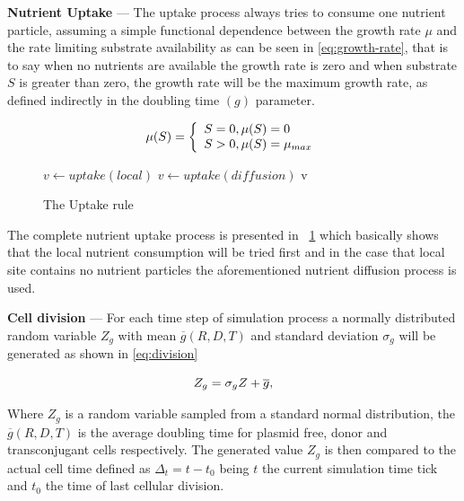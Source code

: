 {\bf Nutrient Uptake} --- The uptake process always tries to consume one nutrient particle, assuming a simple functional dependence between the growth rate $\mu$ and the rate limiting substrate availability as can be seen in \eqref{eq:growth-rate}, that is to say when no nutrients are available the growth rate is zero and when substrate $S$ is greater than zero, the growth rate will be the maximum growth rate, as defined indirectly in the doubling time $(g)$ parameter. 

\begin{equation}
\label{eq:growth-rate}
  \mu(S) = \left\{ 
  \begin{array}{l l}
    S = 0, \mu(S) = 0		\\
    S > 0, \mu(S) = \mu_{max}	\\
  \end{array} \right.
\end{equation} 

\begin{figure}
\begin{algorithmic}[1]
\State $v \gets uptake(local)$
\State $v \gets uptake(diffusion)$ 
\EndIf
\State \Return v
\EndFunction
\end{algorithmic}
\caption[Uptake]{\label{alg:uptake} The Uptake rule}
\end{figure}

The complete nutrient uptake process is presented in ~\ref{alg:uptake} which basically shows that the local nutrient consumption will be tried first and in the case that local site contains no nutrient particles the aforementioned nutrient diffusion process is used.

{\bf Cell division} --- For each time step of simulation process a normally distributed random variable $Z_g$ with mean $\overline{g}(R,D,T)$ and standard deviation $\sigma_g$ will be generated as shown in \eqref{eq:division}

\begin{equation}
\label{eq:division}
\centering 
Z_g = \sigma_g Z + \overline{g},
\end{equation}

Where $Z_g$ is a random variable sampled from a standard normal distribution, the $\overline{g}(R,D,T)$  is the average doubling time for  plasmid free, donor and transconjugant cells respectively. The generated value $Z_g$ is then compared to the actual cell time defined as $\Delta_t = t - t_0$ being $t$ the current simulation time tick and $t_0$ the time of last cellular division.  

